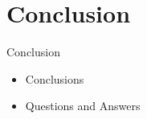 
\section{Conclusion}
\begin{frame}{Conclusion}
\begin{itemize}
\item Conclusions
\item Questions and Answers
\end{itemize}
\end{frame}